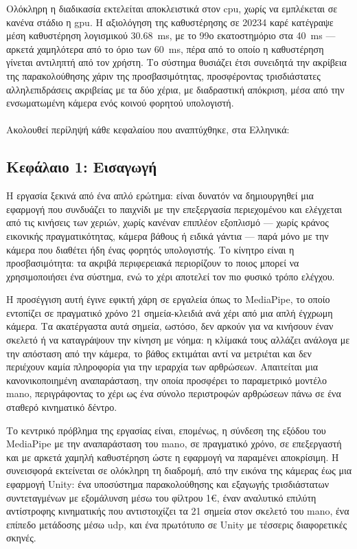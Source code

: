 Ολόκληρη η διαδικασία εκτελείται αποκλειστικά στον \acrshort{cpu}, χωρίς να
εμπλέκεται σε κανένα στάδιο η \acrshort{gpu}. Η αξιολόγηση της καθυστέρησης
σε \num{20234} καρέ κατέγραψε μέση καθυστέρηση λογισμικού \SI{30.68}{\ms},
με το 99ο εκατοστημόριο στα \SI{40}{\ms} --- αρκετά χαμηλότερα από το όριο
των \SI{60}{\ms}, πέρα από το οποίο η καθυστέρηση γίνεται αντιληπτή από τον
χρήστη. Το σύστημα θυσιάζει έτσι συνειδητά την ακρίβεια της παρακολούθησης
χάριν της προσβασιμότητας, προσφέροντας τρισδιάστατες αλληλεπιδράσεις
ακριβείας με τα δύο χέρια, με διαδραστική απόκριση, μέσα από την ενσωματωμένη
κάμερα ενός κοινού φορητού υπολογιστή.\\\\



Ακολουθεί περίληψή κάθε κεφαλαίου που αναπτύχθηκε, στα Ελληνικά:

\subsection*{Κεφάλαιο 1: Εισαγωγή}

Η εργασία ξεκινά από ένα απλό ερώτημα: είναι δυνατόν να δημιουργηθεί μια
εφαρμογή που συνδυάζει το παιχνίδι με την επεξεργασία περιεχομένου και
ελέγχεται από τις κινήσεις των χεριών, χωρίς κανέναν επιπλέον εξοπλισμό ---
χωρίς κράνος εικονικής πραγματικότητας, κάμερα βάθους ή ειδικά γάντια ---
παρά μόνο με την κάμερα που διαθέτει ήδη ένας φορητός υπολογιστής. Το κίνητρο
είναι η προσβασιμότητα: τα ακριβά περιφερειακά περιορίζουν το ποιος μπορεί να
χρησιμοποιήσει ένα σύστημα, ενώ το χέρι αποτελεί τον πιο φυσικό τρόπο ελέγχου.

Η προσέγγιση αυτή έγινε εφικτή χάρη σε εργαλεία όπως το MediaPipe, το οποίο
εντοπίζει σε πραγματικό χρόνο 21 σημεία-κλειδιά ανά χέρι από μια απλή έγχρωμη
κάμερα. Τα ακατέργαστα αυτά σημεία, ωστόσο, δεν αρκούν για να κινήσουν έναν
σκελετό ή να καταγράψουν την κίνηση με νόημα: η κλίμακά τους αλλάζει ανάλογα
με την απόσταση από την κάμερα, το βάθος εκτιμάται αντί να μετριέται και δεν
περιέχουν καμία πληροφορία για την ιεραρχία των αρθρώσεων. Απαιτείται μια
κανονικοποιημένη αναπαράσταση, την οποία προσφέρει το παραμετρικό μοντέλο
\acrshort{mano}, περιγράφοντας το χέρι ως ένα σύνολο περιστροφών αρθρώσεων
πάνω σε ένα σταθερό κινηματικό δέντρο.

Το κεντρικό πρόβλημα της εργασίας είναι, επομένως, η σύνδεση της εξόδου του
MediaPipe με την αναπαράσταση του \acrshort{mano}, σε πραγματικό χρόνο, σε
επεξεργαστή και με αρκετά χαμηλή καθυστέρηση ώστε η εφαρμογή να παραμένει
αποκρίσιμη. Η συνεισφορά εκτείνεται σε ολόκληρη τη διαδρομή, από την εικόνα
της κάμερας έως μια εφαρμογή Unity: ένα υποσύστημα παρακολούθησης και εξαγωγής
τρισδιάστατων συντεταγμένων με εξομάλυνση μέσω του φίλτρου 1\euro{}, έναν
αναλυτικό επιλύτη αντίστροφης κινηματικής που αντιστοιχίζει τα 21 σημεία στον
σκελετό του \acrshort{mano}, ένα επίπεδο μετάδοσης μέσω \acrshort{udp}, και
ένα πρωτότυπο σε Unity με τέσσερις διαφορετικές σκηνές.



